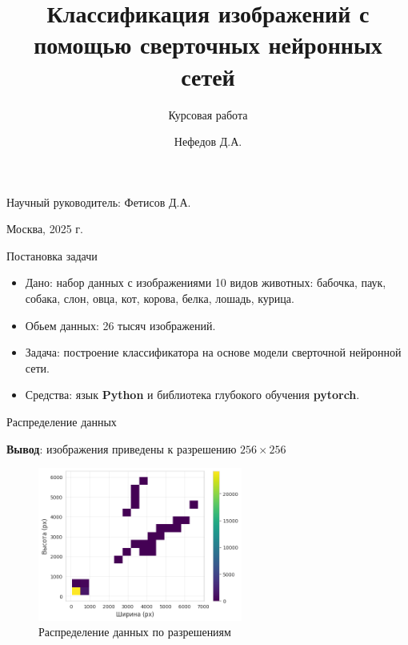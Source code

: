 \documentclass[12pt]{beamer}
\title{Классификация изображений с помощью сверточных нейронных сетей}
\subtitle{Курсовая работа}
\author{Нефедов Д.А.}
\institute{МГТУ им. Н.Э. Баумана}
\date{}
\begin{document}
\sloppy

\begin{frame}
    \titlepage
    \begin{center}
        Научный руководитель: Фетисов Д.А.

        {\fontsize{8}{12}\selectfont Москва, 2025 г.}
    \end{center}
\end{frame}

\begin{frame}{Постановка задачи}
    \begin{itemize}
        \item Дано: набор данных с изображениями 10 видов животных: бабочка, паук, собака, слон, овца, кот, корова, белка, лошадь, курица.
        \item Обьем данных: 26 тысяч изображений.
        \item Задача: построение классификатора на основе модели сверточной нейронной сети.
        \item Средства: язык \textbf{Python} и библиотека глубокого обучения \textbf{pytorch}.
    \end{itemize}
\end{frame}

\begin{frame}{Распределение данных}
    \begin{center}
        \textbf{Вывод}: изображения приведены к разрешению $256 \times 256$
    \end{center}
    \begin{figure}[h]
        \centering
        \includegraphics[width=0.6\textwidth]{images/data_dist.png}
        \caption{Распределение данных по разрешениям}
        \label{fig:data_dist}
    \end{figure}
\end{frame}
\end{document}
